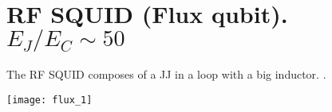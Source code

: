 

\section{RF SQUID (Flux qubit).  $ E_J/E_C\sim 50 $ \label{sec:rfSquid}}

\begin{framed}\noindent
  \noindent The RF SQUID composes of a JJ in a loop with a big inductor.
  .
  \begin{center}
    \texttt{[image: flux\_1]}
  \end{center}
\end{framed}



